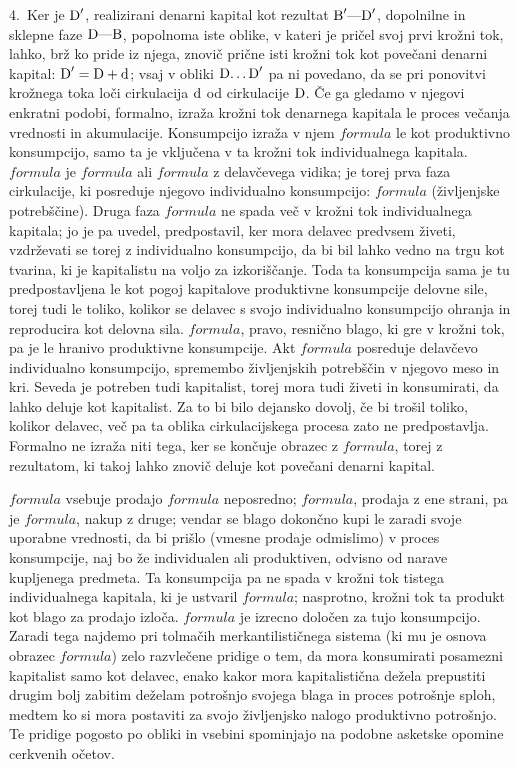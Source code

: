 \documentclass[kapital_02.tex]{subfiles}
\begin{document}
4.\ Ker je \( \textrm{D}' \), realizirani denarni kapital kot rezultat \( \textrm{B}'\textrm{---}\textrm{D}' \), dopolnilne in sklepne faze \( \textrm{D}\textrm{---}\textrm{B} \), popolnoma iste oblike, v kateri je pričel svoj prvi krožni tok, lahko, brž ko pride iz njega, znovič prične isti krožni tok kot povečani denarni kapital: \( \textrm{D}' = \textrm{D} + \textrm{d} \); vsaj v obliki \( \textrm{D}\textrm{\dots}\textrm{D}' \) pa ni povedano, da se pri ponovitvi krožnega toka loči cirkulacija \( \textrm{d} \) od cirkulacije \( \textrm{D} \). Če ga gledamo v njegovi enkratni podobi, formalno, izraža krožni tok denarnega kapitala le proces večanja vrednosti in akumulacije. Konsumpcijo izraža v njem \( formula \) le kot produktivno konsumpcijo, samo ta je vključena v ta krožni tok individualnega kapitala. \( formula \) je \( formula \) ali \( formula \) z delavčevega vidika; je torej prva faza cirkulacije, ki posreduje njegovo individualno konsumpcijo: \( formula \) (življenjske potrebščine). Druga faza \( formula \) ne spada več v krožni tok individualnega kapitala; jo je pa uvedel, predpostavil, ker mora delavec predvsem živeti, vzdrževati se torej z individualno konsumpcijo, da bi bil lahko vedno na trgu kot tvarina, ki je kapitalistu na voljo za izkoriščanje. Toda ta konsumpcija sama je tu predpostavljena le kot pogoj kapitalove produktivne konsumpcije delovne sile, torej tudi le toliko, kolikor se delavec s svojo individualno konsumpcijo ohranja in reproducira kot delovna sila. \( formula \), pravo, resnično blago, ki gre v krožni tok, pa je le hranivo produktivne konsumpcije. Akt \( formula \) posreduje delavčevo individualno konsumpcijo, spremembo življenjskih potrebščin v njegovo meso in kri. Seveda je potreben tudi kapitalist, torej mora tudi živeti in konsumirati, da lahko deluje kot kapitalist. Za to bi bilo dejansko dovolj, če bi trošil toliko, kolikor delavec, več pa ta oblika cirkulacijskega procesa zato ne predpostavlja. Formalno ne izraža niti tega, ker se končuje obrazec z \( formula \), torej z rezultatom, ki takoj lahko znovič deluje kot povečani denarni kapital.

\( formula \) vsebuje prodajo \( formula \) neposredno; \( formula \), prodaja z ene strani, pa je \( formula \), nakup z druge; vendar se blago dokončno kupi le zaradi svoje uporabne vrednosti, da bi prišlo (vmesne prodaje odmislimo) v proces konsumpcije, naj bo že individualen ali produktiven, odvisno od narave kupljenega predmeta. Ta konsumpcija pa ne spada v krožni tok tistega individualnega kapitala, ki je ustvaril \( formula \); nasprotno, krožni tok ta produkt kot blago za prodajo izloča. \( formula \) je izrecno določen za tujo konsumpcijo. Zaradi tega najdemo pri tolmačih merkantilističnega sistema (ki mu je osnova obrazec \( formula \)) zelo razvlečene pridige o tem, da mora konsumirati posamezni kapitalist samo kot delavec, enako kakor mora kapitalistična dežela prepustiti drugim bolj zabitim deželam potrošnjo svojega blaga in proces potrošnje sploh, medtem ko si mora postaviti za svojo življenjsko nalogo produktivno potrošnjo. Te pridige pogosto po obliki in vsebini spominjajo na podobne asketske opomine cerkvenih očetov.
\end{document}
